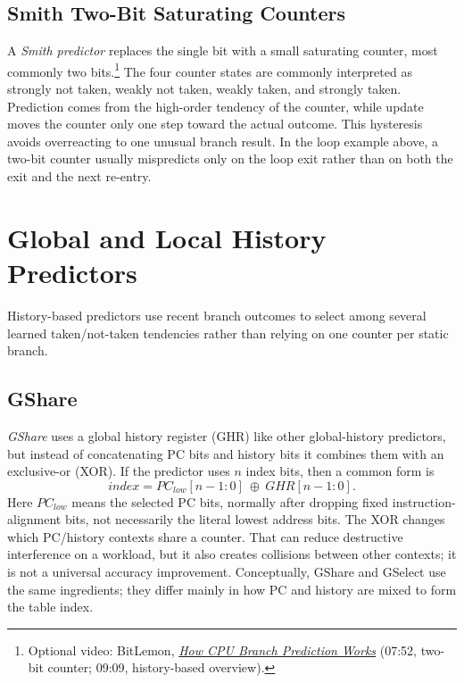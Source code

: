 \subsection{Smith Two-Bit Saturating Counters}\label{subsec:auto-0100a}
A \textit{Smith predictor} replaces the single bit with a small saturating counter, most commonly two bits.\footnote{Optional video: BitLemon, \href{https://youtu.be/UbDIoNY9E0w?t=472}{\emph{How CPU Branch Prediction Works}} (07:52, two-bit counter; 09:09, history-based overview).}
The four counter states are commonly interpreted as strongly not taken, weakly not taken, weakly taken, and strongly taken.
Prediction comes from the high-order tendency of the counter, while update moves the counter only one step toward the actual outcome.
This hysteresis avoids overreacting to one unusual branch result.
In the loop example above, a two-bit counter usually mispredicts only on the loop exit rather than on both the exit and the next re-entry.


\section{Global and Local History Predictors}\label{sec:auto-043a}
History-based predictors use recent branch outcomes to select among several learned taken/not-taken tendencies rather than relying on one counter per static branch.

\subsection{GShare}\label{subsec:auto-010aa}
\textit{GShare} uses a global history register (GHR) like other global-history predictors, but instead of concatenating PC bits and history bits it combines them with an exclusive-or (XOR).
If the predictor uses $n$ index bits, then a common form is
\begin{equation}\label{eq:pipe-gshare-index}
    index = PC_{low}[n-1:0]\ \oplus\ GHR[n-1:0].
\end{equation}
Here $PC_{low}$ means the selected PC bits, normally after dropping fixed instruction-alignment bits, not necessarily the literal lowest address bits.
The XOR changes which PC/history contexts share a counter.
That can reduce destructive interference on a workload, but it also creates collisions between other contexts; it is not a universal accuracy improvement.
Conceptually, GShare and GSelect use the same ingredients; they differ mainly in how PC and history are mixed to form the table index.

